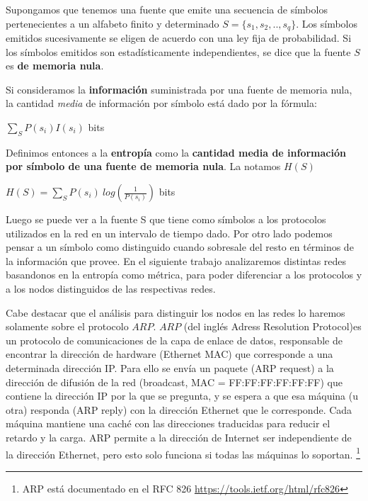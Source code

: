 Supongamos que tenemos una fuente que emite una secuencia de símbolos pertenecientes a un alfabeto finito y determinado $S = \{s_1, s_2, .., s_q\}$. Los símbolos emitidos sucesivamente se eligen de acuerdo con una ley fija de probabilidad. Si los símbolos emitidos son estadísticamente independientes, se dice que la fuente $S$ es \textbf{de memoria nula}.

Si consideramos la \textbf{información} suministrada por una fuente de memoria nula, la cantidad \emph{media} de información por símbolo está dado por la fórmula:
\begin{center}
    $\displaystyle \sum_S P(s_i) I(s_i)$ bits
\end{center}


Definimos entonces a la \textbf{entropía} como la \textbf{cantidad media de información por símbolo de una fuente de memoria nula}. La notamos $H(S)$
\begin{center}
$\displaystyle H(S) = \sum_S P(s_i)\ log(\frac{1}{P(s_i)})$ bits
\end{center}

Luego se puede ver a la fuente S que tiene como símbolos a los protocolos utilizados en la red en un intervalo de tiempo dado.
Por otro lado podemos pensar a un símbolo como distinguido cuando sobresale del resto en términos de la información que provee.
En el siguiente trabajo analizaremos distintas redes basandonos en la entropía como métrica, 
para poder diferenciar a los protocolos y a los nodos distinguidos de las respectivas redes.

Cabe destacar que el análisis para distinguir los nodos en las redes lo haremos solamente sobre el protocolo $ARP$.
$ARP$ (del inglés Adress Resolution Protocol)es un protocolo de comunicaciones de la capa de enlace de datos, responsable de encontrar la dirección de hardware (Ethernet MAC) que corresponde a una determinada dirección IP. Para ello se envía un paquete (ARP request) a la dirección de difusión de la red (broadcast, MAC = FF:FF:FF:FF:FF:FF) que contiene la dirección IP por la que se pregunta, y se espera a que esa máquina (u otra) responda (ARP reply) con la dirección Ethernet que le corresponde. Cada máquina mantiene una caché con las direcciones traducidas para reducir el retardo y la carga. ARP permite a la dirección de Internet ser independiente de la dirección Ethernet, pero esto solo funciona si todas las máquinas lo soportan.
 \footnote{ARP está documentado en el RFC 826 \url{https://tools.ietf.org/html/rfc826}}
